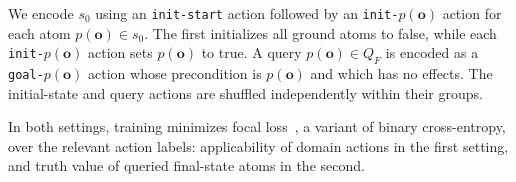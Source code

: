 We encode $s_0$ using an \texttt{init-start} action followed by an \texttt{init-}$p(\mathbf{o})$ action for each atom $p(\mathbf{o})\in s_0$. The first initializes all ground atoms to false, while each \texttt{init-}$p(\mathbf{o})$ action sets $p(\mathbf{o})$ to true. A query $p(\mathbf{o})\in Q_F$ is encoded as a
\texttt{goal-}$p(\mathbf{o})$ action whose precondition is $p(\mathbf{o})$ and which has no effects.
The initial-state and query actions are shuffled independently within their groups.

In both settings, training minimizes focal loss~\citep{lin2017focal}, a variant of binary cross-entropy, over the relevant action labels: applicability of domain actions in the first setting, and truth value of queried final-state atoms in the second.